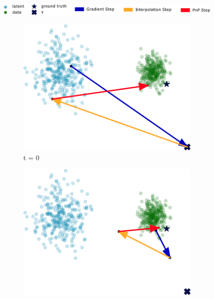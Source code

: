 \documentclass{article} %
\theoremstyle{definition}
\begin{document}
\begin{figure}[t!]
    \centering
    \begin{adjustbox}{center}
    \includegraphics[width=\textwidth]{figures/toy/legend.pdf} %
    \end{adjustbox}
    \begin{subfigure}{0.3\textwidth}
        \centering
    \includegraphics[width=\textwidth]{figures/toy/final_0.00_toy.pdf} %
    \caption{t = 0}
        \label{fig:figure1}
    \end{subfigure}%
    \hfill %
    \begin{subfigure}{0.3\textwidth}
        \centering
    \includegraphics[width=\textwidth]{figures/toy/final_0.56_toy.pdf} %

\end{subfigure}
\end{figure}
\end{document}
